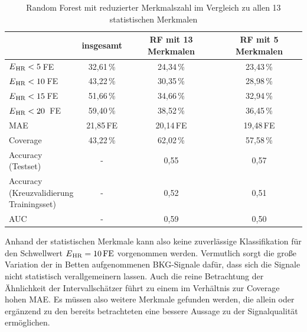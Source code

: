  \begin{table}[H]
 	\centering
  	\begin{tabular}{l || c | c | c}
 																& insgesamt 		& RF mit 13 Merkmalen			& RF mit 5 Merkmalen\\\hline
 		$E\textsubscript{HR} < 5$\,\si{FE} 						& 32{,}61\,\% 		& 24,34\,\%			& 23,43\,\%	\\
 		$E\textsubscript{HR} < 10$\,\si{FE} 						& 43{,}22\,\% 		& 30,35\,\% 		& 28,98\,\%	\\
 		$E\textsubscript{HR} < 15$\,\si{FE} 						& 51{,}66\,\% 		& 34,66\,\% 		& 32,94\,\%	\\
 		$E\textsubscript{HR} < 20$ \,\si{FE}						& 59{,}40\,\% 		& 38,52\,\% 		& 36,45\,\%\\\hline
 		MAE														& 21{,}85\,\si{FE}	& 20,14\,\si{FE}	& 19{,}48\,\si{FE}\\\hline
 		Coverage												& 43{,22}\,\%		& 62,02\,\%			& 57,58\,\%\\\hline
 		\makecell[l]{Accuracy\\(Testset)}						& -					& 0,55				& 0,57\\\hline
 		\makecell[l]{Accuracy\\(Kreuzvalidierung\\Trainingsset)}	& -					& 0{,}52			& 0,51\\\hline
 		AUC														& -					& 0,59				& 0,50
 	\end{tabular}
 	\caption{Random Forest mit reduzierter Merkmalszahl im Vergleich zu allen 13 statistischen Merkmalen}
 	\label{fig:ml-statistical-reduced-comparison}
 \end{table}

Anhand der statistischen Merkmale kann also keine zuverlässige Klassifikation für den Schwellwert $E\textsubscript{HR} = 10\,\si{FE}$ vorgenommen werden. Vermutlich sorgt die große Variation der in Betten aufgenommenen \ac{BKG}-Signale dafür, dass sich die Signale nicht statistisch verallgemeinern lassen. Auch die reine Betrachtung der Ähnlichkeit der Intervallschätzer führt zu einem im Verhältnis zur Coverage hohen \ac{MAE}. Es müssen also weitere Merkmale gefunden werden, die allein oder ergänzend zu den bereits betrachteten eine bessere Aussage zu der Signalqualität ermöglichen. %


